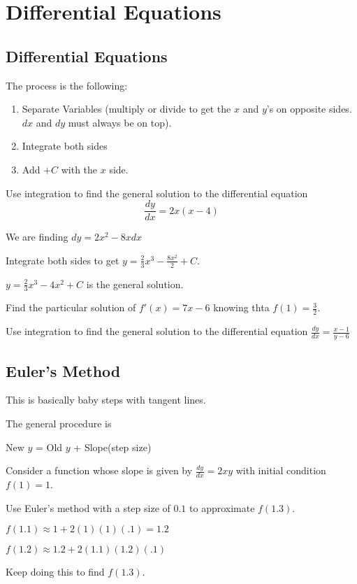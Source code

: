 \documentclass[../bccalc.tex]{subfiles}
\begin{document}
\chapter{Differential Equations}
\section{Differential Equations}
The process is the following:
\begin{enumerate}
    \item Separate Variables (multiply or divide to get the $x$ and $y$'s on opposite sides. $dx$ and $dy$ must always be on top).
    \item Integrate both sides 
    \item Add $+C$ with the $x$ side.
\end{enumerate}

\begin{example}
    Use integration to find the general solution to the differential equation 
    \[ \frac{dy}{dx}=2x(x-4) \]

    We are finding $dy=2x^2-8x dx$

    Integrate both sides to get $y=\frac{2}{3}x^3-\frac{8x^2}{2}+C$.

    $y=\frac{2}{3}x^3-4x^2+C$ is the general solution.
\end{example}

\ex Find the particular solution of $f'(x)=7x-6$ knowing thta $f(1)=\frac{3}{2}$.

\ex Use integration to find the general solution to the differential equation $\frac{dy}{dx}=\frac{x-1}{y-6}$

\section{Euler's Method}
This is basically baby steps with tangent lines.

The general procedure is 
\begin{center}
    New $y$ = Old $y$ + Slope(step size)
\end{center}

\begin{example}
    Consider a function whose slope is given by $\frac{dy}{dx}=2xy$ with initial condition $f(1)=1$.

    Use Euler's method with a step size of $0.1$ to approximate $f(1.3)$.

    $f(1.1)\approx 1+2(1)(1)(.1)=1.2$

    $f(1.2)\approx 1.2+2(1.1)(1.2)(.1)$

    Keep doing this to find $f(1.3)$.
\end{example}
\end{document}
